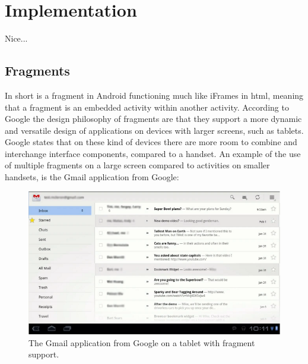 \chapter{Implementation}
Nice...

\section{Fragments}

In short is a fragment in Android functioning much like iFrames in html, meaning that a fragment is an embedded activity within another activity.
According to Google the design philosophy of fragments are that they support a more dynamic and versatile design of applications on devices with larger screens, such as tablets.
Google states that on these kind of devices there are more room to combine and interchange interface components, compared to a handset. 
An example of the use of multiple fragments on a large screen compared to activities on smaller handsets, is the Gmail application from Google:


\begin{figure}[htbp]
	\centering
		\includegraphics{Images/Implementation/fragment_gmail.png}
	\caption{The Gmail application from Google on a tablet with fragment support.}
	\label{fig:fragment_gmail}
\end{figure}

